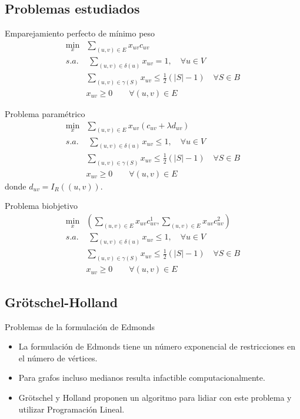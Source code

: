 \documentclass{beamer}
\begin{document}
\subsection{Problemas estudiados}
\begin{frame}{Emparejamiento perfecto de mínimo peso}
\begin{align*}
\min_x & \sum_{(u,v) \in E}x_{uv}c_{uv}\\
s.a.&\;\sum_{(u,v)\in\delta(u)} x_{uv} = 1, \quad \forall u \in V\\
&\sum_{(u,v)\in \gamma(S)} x_{uv} \leq \frac{1}{2}(|S|-1)\quad \forall S \in B	\\
&x_{uv} \geq 0 \qquad \forall(u,v)\in E
\end{align*}
\end{frame}
\begin{frame}{Problema paramétrico}\begin{align*}
\min_x & \sum_{(u,v) \in E}x_{uv} (c_{uv} + \lambda d_{uv})\\
s.a.&\;\sum_{(u,v)\in\delta(u)} x_{uv} \leq 1, \quad \forall u \in V\\
&\sum_{(u,v)\in \gamma(S)} x_{uv} \leq \frac{1}{2}(|S|-1)\quad \forall S \in B	\\
&x_{uv} \geq 0 \qquad \forall(u,v)\in E
\end{align*}
donde $d_{uv} = I_R((u,v))$.
\end{frame}
\begin{frame}{Problema biobjetivo}
\begin{align*}
\min_x & \left(\sum_{(u,v) \in E}x_{uv}c^1_{uv},\sum_{(u,v) \in E}x_{uv} c^2_{uv}\right)\\
s.a.&\;\sum_{(u,v)\in\delta(u)} x_{uv} \leq 1, \quad \forall u \in V\\
&\sum_{(u,v)\in \gamma(S)} x_{uv} \leq \frac{1}{2}(|S|-1)\quad \forall S \in B	\\
&x_{uv} \geq 0 \qquad \forall(u,v)\in E
\end{align*}
\end{frame}
\subsection{Grötschel-Holland}
\begin{frame}{Problemas de la formulación de Edmonds}
\begin{itemize}
\item La formulación de Edmonds tiene un número exponencial de restricciones en el número de vértices.
\item Para grafos incluso medianos resulta infactible computacionalmente.
\item Grötschel y Holland proponen un algoritmo para lidiar con este problema y utilizar Programación Lineal.
\end{itemize}
\end{frame}
\end{document}
